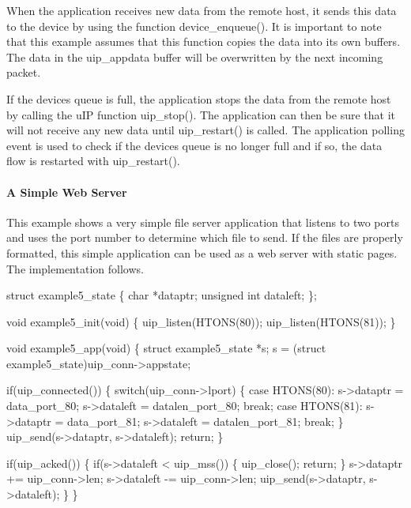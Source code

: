 When the application receives new data from the remote host, it sends this data to the device by using the function device\+\_\+enqueue(). It is important to note that this example assumes that this function copies the data into its own buffers. The data in the uip\+\_\+appdata buffer will be overwritten by the next incoming packet.

If the device\textquotesingle{}s queue is full, the application stops the data from the remote host by calling the u\+IP function uip\+\_\+stop(). The application can then be sure that it will not receive any new data until uip\+\_\+restart() is called. The application polling event is used to check if the device\textquotesingle{}s queue is no longer full and if so, the data flow is restarted with uip\+\_\+restart().\hypertarget{a00074_example5}{}\paragraph{A Simple Web Server}\label{a00074_example5}
This example shows a very simple file server application that listens to two ports and uses the port number to determine which file to send. If the files are properly formatted, this simple application can be used as a web server with static pages. The implementation follows.


\begin{DoxyCode}
\textcolor{keyword}{struct }example5\_state \{
   \textcolor{keywordtype}{char} *dataptr;
   \textcolor{keywordtype}{unsigned} \textcolor{keywordtype}{int} dataleft;
\};

\textcolor{keywordtype}{void} example5\_init(\textcolor{keywordtype}{void}) \{
   uip\_listen(HTONS(80));
   uip\_listen(HTONS(81));
\}

\textcolor{keywordtype}{void} example5\_app(\textcolor{keywordtype}{void}) \{
   \textcolor{keyword}{struct }example5\_state *s;
   s = (\textcolor{keyword}{struct }example5\_state)uip\_conn->appstate;
   
   \textcolor{keywordflow}{if}(uip\_connected()) \{
      \textcolor{keywordflow}{switch}(uip\_conn->lport) \{
      \textcolor{keywordflow}{case} HTONS(80):
         s->dataptr = data\_port\_80;
         s->dataleft = datalen\_port\_80;
         \textcolor{keywordflow}{break};
      \textcolor{keywordflow}{case} HTONS(81):
         s->dataptr = data\_port\_81;
         s->dataleft = datalen\_port\_81;
         \textcolor{keywordflow}{break};
      \}
      uip\_send(s->dataptr, s->dataleft);
      \textcolor{keywordflow}{return};      
   \}

   \textcolor{keywordflow}{if}(uip\_acked()) \{
      \textcolor{keywordflow}{if}(s->dataleft < uip\_mss()) \{
         uip\_close();
         \textcolor{keywordflow}{return};
      \}
      s->dataptr += uip\_conn->len;
      s->dataleft -= uip\_conn->len;
      uip\_send(s->dataptr, s->dataleft);      
   \}
\}
\end{DoxyCode}


